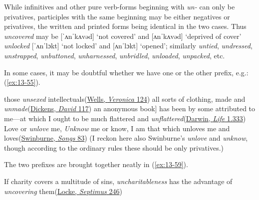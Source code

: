 While infinitives and other pure verb-forms beginning with \textit{un-} can only be privatives, participles with the same beginning may be either negatives or privatives, the written and printed forms being identical in the two cases. Thus \mbox{\textit{uncovered}} may be [ˈʌnˈkʌvəd] `not covered' and [ʌnˈkʌvəd] `deprived of cover' \textit{unlocked} [ˈʌnˈlɔkt] `not locked' and [ʌnˈlɔkt] `opened'; similarly \textit{untied}, \textit{undressed}, \textit{unstrapped}, \textit{unbuttoned}, \textit{unharnessed}, \textit{unbridled}, \textit{unloaded}, \textit{unpacked}, etc.\largerpage

In some cases, it may be doubtful whether we have one or the other prefix, e.g.: (\ref{ex:13-55}).

\ea\label{ex:13-55}
\ea those \emph{unsexed} intellectuals\hfill(\href{https://archive.org/details/annveronicamoder0000hgwe/page/128/mode/2up?q=%22unsexed%22&view=theater}{Wells, \textit{Veronica} 124})
\ex all sorts of clothing, made and \emph{unmade}\hfill(\href{https://archive.org/details/personalhistory05dickgoog/page/n57/mode/2up?q=%22sorts+of+clothing%22&view=theater}{Dickens, \textit{David} 117})
\ex {[}an anonymous book{]} has been by some attributed to me---at which I ought to be much flattered and \emph{unflattered}\hfill(\href{https://www.darwinproject.ac.uk/letter/DCP-LETT-859.xml}{Darwin, \textit{Life} 1.333}) %
\ex Love or \emph{unlove} me, \emph{Unknow} me or know, I am that which unloves me and loves\hfill(\href{https://archive.org/details/cu31924013555911/page/n93/mode/2up?q=%22unknow+me%22&view=theater}{Swinburne, \textit{Songs} 83})
\z
\z
\noindent (I reckon here also Swinburne's \textit{unlove} and \textit{unknow}, though according to the ordinary rules these should be only privatives.) %

The two prefixes are brought together neatly in (\ref{ex:13-59}).

\ea \label{ex:13-59} If charity covers a multitude of sins, \emph{uncharitableness} has the advantage of \emph{uncovering} them\hfill(\href{https://archive.org/details/septimus00unkngoog/page/n233/mode/2up?q=%22charity+covers%22&view=theater}{Locke, \textit{Septimus} 246})
\z

